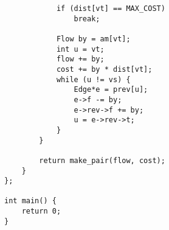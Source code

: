 \begin{verbatim}
            if (dist[vt] == MAX_COST)
                break;

            Flow by = am[vt];
            int u = vt;
            flow += by;
            cost += by * dist[vt];
            while (u != vs) {
                Edge*e = prev[u];
                e->f -= by;
                e->rev->f += by;
                u = e->rev->t;
            }
        }

        return make_pair(flow, cost);
    }
};

int main() {
    return 0;
}
\end{verbatim}
